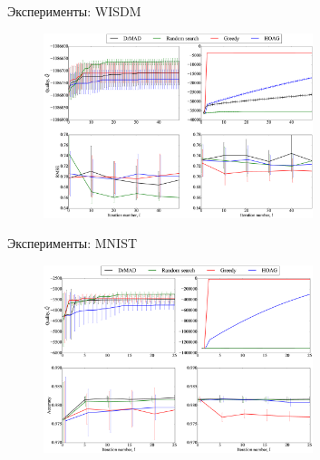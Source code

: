 \documentclass[10pt,pdf,utf8,russian,aspectratio=169]{beamer}
\begin{document}
\begin{frame}{Эксперименты: WISDM}
\begin{figure}  
\includegraphics[width=0.7\textwidth]{Fig_wisdm.eps}
\end{figure}
\end{frame}

\begin{frame}{Эксперименты: MNIST}
\begin{figure}  
\includegraphics[width=0.7\textwidth]{Fig_mnist.eps}
\end{figure}
\end{frame}
\end{document}
